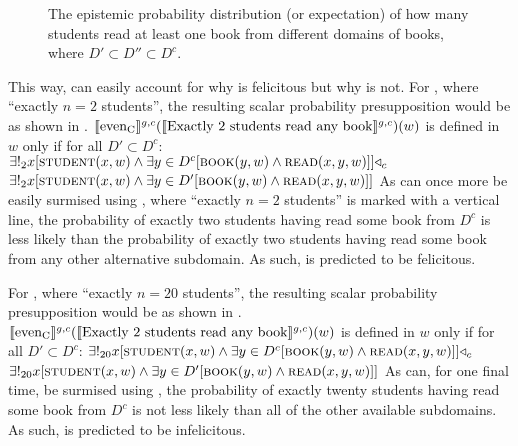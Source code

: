 \begin{figure}[!htb]
    
    \caption{The epistemic probability distribution (or expectation) of how many students read at least one book from different domains of books, where $D'\subset D''\subset D^c$.}
\end{figure}
This way, \textcite{Crnic2011,Crnic2014-dogma,Crnic2014-nm} can easily account for why  is felicitous but why  is not. For , where \enquote{exactly $n=2$ students}, the resulting scalar probability presupposition would be as shown in .
\ex
$\intension[g,c]{even\textsubscript{C}}(\intension[g,c]{Exactly 2 students read any book})(w)$ is defined in $w$ only if for all $D'\subset D^c$: $\exists!_2{x}[\predicate{student}(x,w)\land\exists{y\in{D^c}}[\predicate{book}(y,w)\land\predicate{read}(x,y,w)]]\lprob_c$\\\emptyfill$\exists!_2{x}[\predicate{student}(x,w)\land\exists{y\in{D'}}[\predicate{book}(y,w)\land\predicate{read}(x,y,w)]]$
\xe
As can once more be easily surmised using , where \enquote{exactly $n=2$ students} is marked with a vertical line, the probability of exactly two students having read some book from $D^c$ is less likely than the probability of exactly two students having read some book from any other alternative subdomain. As such,  is predicted to be felicitous.

For , where \enquote{exactly $n=20$ students}, the resulting scalar probability presupposition would be as shown in .
\ex
$\intension[g,c]{even\textsubscript{C}}(\intension[g,c]{Exactly 2 students read any book})(w)$ is defined in $w$ only if for all $D'\subset D^c$: $\exists!_{20}{x}[\predicate{student}(x,w)\land\exists{y\in{D^c}}[\predicate{book}(y,w)\land\predicate{read}(x,y,w)]]\lprob_c$\\\emptyfill$\exists!_{20}{x}[\predicate{student}(x,w)\land\exists{y\in{D'}}[\predicate{book}(y,w)\land\predicate{read}(x,y,w)]]$
\xe
As can, for one final time, be surmised using , the probability of exactly twenty students having read some book from $D^c$ is not less likely than all of the other available subdomains. As such,  is predicted to be infelicitous.

